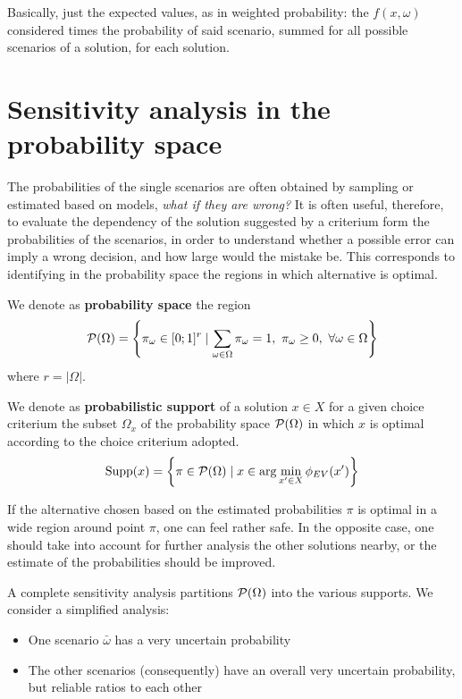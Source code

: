 Basically, just the expected values, as in weighted probability: the $f(x, \omega)$ considered times the probability of said scenario, summed for all possible scenarios of a solution, for each solution.

\section{Sensitivity analysis in the probability space}
\label{sec:sensanalysisprobspace}

The probabilities of the single scenarios are often obtained by sampling or estimated based on models, \textit{what if they are wrong?} It is often useful, therefore, to evaluate the dependency of the solution suggested by a criterium form the probabilities of the scenarios, in order to understand whether a possible error can imply a wrong decision, and how large would the mistake be. This corresponds to identifying in the probability space the regions in which alternative is optimal. \\

\begin{definition}
	We denote as \textbf{probability space} the region
	$$ \P (\Omega) = \left\{\pi_\omega \in [0;1]^r \mid \sum_{\omega \in \Omega} \pi_\omega = 1,\ \pi_\omega \geq 0, \ \forall \omega \in \Omega \right\} $$
	where $r = |\Omega|$.  \\
\end{definition}

\begin{definition}
	We denote as \textbf{probabilistic support} of a solution $x \in X$ for a given choice criterium the subset $\Omega_x$ of the probability space $\P (\Omega)$ in which $x$ is optimal according to the choice criterium adopted.
	$$ \supp (x) = \left\{\pi \in \P (\Omega) \mid x \in \arg \min_{x' \in X} \phi_{EV} (x') \right\}$$
\end{definition}

If the alternative chosen based on the estimated probabilities $\pi$ is optimal in a wide region around point $\pi$, one can feel rather safe. In the opposite case, one should take into account for further analysis the other solutions nearby, or the estimate of the probabilities should be improved. 

A complete sensitivity analysis partitions $\P (\Omega)$ into the various supports. We consider a simplified analysis: 
\begin{itemize}
	\item One scenario $\bar \omega$ has a very uncertain probability
	
	\item The other scenarios (consequently) have an overall very uncertain probability, but reliable ratios to each other
\end{itemize}

